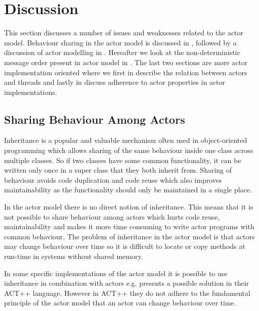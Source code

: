 \section{Discussion}\label{sec:actor_discussion}
This section discusses a number of issues and weaknesses related to the actor model. Behaviour sharing in the actor model is discussed in , followed by a discussion of actor modelling in . Hereafter we look at the non-deterministic message order present in actor model in . The last two sections are more actor implementation oriented where we first in  describe the relation between actors and threads and lastly in  discuss adherence to actor properties in actor implementations.

\subsection{Sharing Behaviour Among Actors}\label{ssec:share_behaviour}
Inheritance is a popular and valuable mechanism often used in object-oriented programming which allows sharing of the same behaviour inside one class across multiple classes\cite{kafura1989inheritance}. So if two classes have some common functionality, it can be written only once in a super class that they both inherit from. Sharing of behaviour avoids code duplication and code reuse which also improves maintainability as the functionality should only be maintained in a single place.

In the actor model there is no direct notion of inheritance\cite{mackay1997has}. This means that it is not possible to share behaviour among actors which hurts code reuse, maintainability and makes it more time consuming to write actor programs with common behaviour. The problem of inheritance in the actor model is that actors may change behaviour over time so it is difficult to locate or copy methods at run-time in systems without shared memory\cite{kafura1989inheritance}.

In some specific implementations of the actor model it is possible to use inheritance in combination with actors e.g. \cite{kafura1989inheritance} presents a possible solution in their ACT++ language. However in ACT++ they do not adhere to the fundamental principle of the actor model that an actor can change behaviour over time. 

